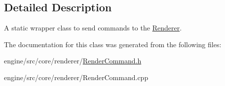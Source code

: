 \subsection{Detailed Description}
A static wrapper class to send commands to the \hyperlink{classengine_1_1renderer_1_1Renderer}{Renderer}. 

The documentation for this class was generated from the following files\+:\begin{DoxyCompactItemize}
\item 
engine/src/core/renderer/\hyperlink{RenderCommand_8h}{Render\+Command.\+h}\item 
engine/src/core/renderer/Render\+Command.\+cpp\end{DoxyCompactItemize}
